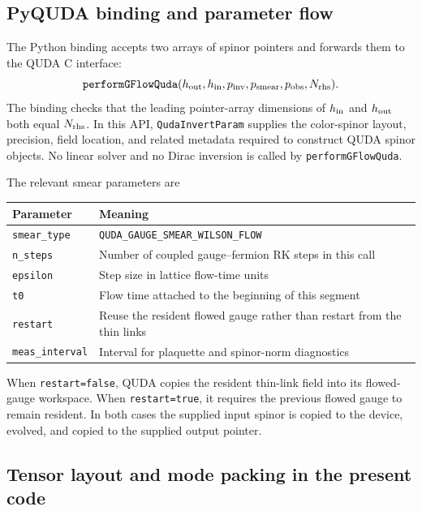 \documentclass[11pt]{article}
\numberwithin{equation}{section}
\begin{document}
\subsection{PyQUDA binding and parameter flow}

The Python binding accepts two arrays of spinor pointers and forwards them to
the QUDA C interface:
\begin{equation}
  \texttt{performGFlowQuda}
  (h_{\rm out},h_{\rm in},p_{\rm inv},p_{\rm smear},p_{\rm obs},N_{\rm rhs}).
  \label{eq:pyquda-gflow-signature}
\end{equation}
The binding checks that the leading pointer-array dimensions of
\(h_{\rm in}\) and \(h_{\rm out}\) both equal \(N_{\rm rhs}\).  In this API,
\texttt{QudaInvertParam} supplies the color-spinor layout, precision, field
location, and related metadata required to construct QUDA spinor objects.
No linear solver and no Dirac inversion is called by
\texttt{performGFlowQuda}.

The relevant smear parameters are
\begin{center}
\begin{tabular}{p{}p{}}
  \toprule
  Parameter & Meaning \\
  \midrule
  \texttt{smear\_type}
  & \texttt{QUDA\_GAUGE\_SMEAR\_WILSON\_FLOW} \\
  \texttt{n\_steps}
  & Number of coupled gauge--fermion RK steps in this call \\
  \texttt{epsilon}
  & Step size in lattice flow-time units \\
  \texttt{t0}
  & Flow time attached to the beginning of this segment \\
  \texttt{restart}
  & Reuse the resident flowed gauge rather than restart from the thin links \\
  \texttt{meas\_interval}
  & Interval for plaquette and spinor-norm diagnostics \\
  \bottomrule
\end{tabular}
\end{center}
When \texttt{restart=false}, QUDA copies the resident thin-link field into its
flowed-gauge workspace.  When \texttt{restart=true}, it requires the previous
flowed gauge to remain resident.  In both cases the supplied input spinor is
copied to the device, evolved, and copied to the supplied output pointer.

\subsection{Tensor layout and mode packing in the present code}
\end{document}
